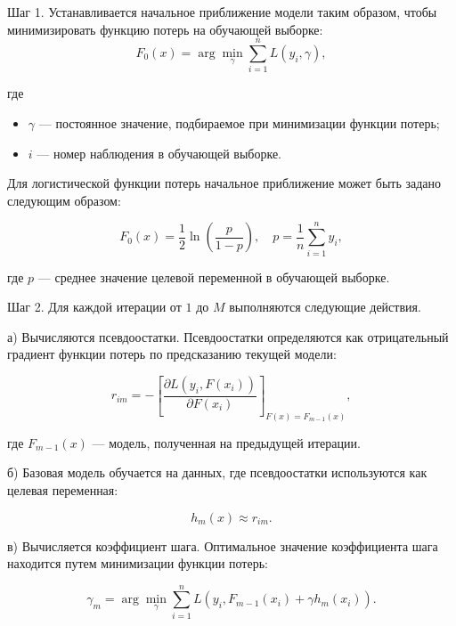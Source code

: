 Шаг 1. Устанавливается начальное приближение модели таким образом, чтобы минимизировать функцию потерь на обучающей выборке:
\begin{equation}
  F_0(x) = \arg\min_{\gamma} \sum_{i=1}^{n} L(y_i, \gamma),
\end{equation}

где

\begin{itemize}
  \item $\gamma$ --- постоянное значение, подбираемое при минимизации функции потерь;
  \item $i$ --- номер наблюдения в обучающей выборке.
\end{itemize}


Для логистической функции потерь начальное приближение может быть задано следующим образом:

\begin{equation}
  F_0(x) = \frac{1}{2} \ln\left(\frac{p}{1-p}\right), \quad p = \frac{1}{n} \sum_{i=1}^{n} y_i,
\end{equation}

где $p$ --- среднее значение целевой переменной в обучающей выборке.

Шаг 2. Для каждой итерации от $1$ до $M$ выполняются следующие действия.

а) Вычисляются псевдоостатки. Псевдоостатки определяются как отрицательный градиент функции потерь по предсказанию текущей модели:

\begin{equation}
  r_{im} = -\left[\frac{\partial L(y_i, F(x_i))}{\partial F(x_i)}\right]_{F(x) = F_{m-1}(x)},
\end{equation}

где $F_{m-1}(x)$ --- модель, полученная на предыдущей итерации.

б) Базовая модель обучается на данных, где псевдоостатки используются как целевая переменная:

\begin{equation}
  h_m(x) \approx r_{im}.
\end{equation}

в) Вычисляется коэффициент шага. Оптимальное значение коэффициента шага находится путем минимизации функции потерь:

\begin{equation}
  \gamma_m = \arg\min_{\gamma} \sum_{i=1}^{n} L\left(y_i, F_{m-1}(x_i) + \gamma h_m(x_i)\right).
\end{equation}

